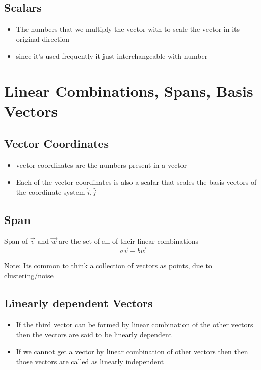 \documentclass[a4paper]{article}
\begin{document}
\subsection{Scalars}
\begin{itemize}
	\item The numbers that we multiply the vector with to scale the vector
	      in its original direction
	\item since it's used frequently it just interchangeable with number
\end{itemize}


\newpage
\section{Linear Combinations, Spans, Basis Vectors}

\subsection{Vector Coordinates}
\begin{itemize}
	\item vector coordinates are the numbers present in a vector
	\item Each of the vector coordinates is also a scalar
	      that scales the basis vectors of the coordinate system $\hat{i}, \hat{j}$
\end{itemize}

\subsection{Span}
Span of $\vec{v} \text{ and } \vec{w}$ are the set of all of their linear combinations
\[
	a \vec{v} + b \vec{w}
\]

Note: Its common to think a collection of vectors as points, due to clustering/noise

\subsection{Linearly dependent Vectors}
\begin{itemize}
	\item If the third vector can be formed by linear combination of the other vectors
	      then the vectors are said to be linearly dependent
	\item If we cannot get a vector by linear combination of other vectors then
	      then those vectors are called as linearly independent
\end{itemize}
\end{document}
